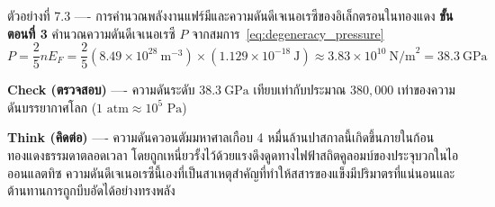 \begin{psctbox}{ตัวอย่างที่ 7.3 ---- การคำนวณพลังงานแฟร์มีและความดันดีเจเนอเรซีของอิเล็กตรอนในทองแดง}
\textbf{ขั้นตอนที่ 3} คำนวณความดันดีเจเนอเรซี $P$
จากสมการ~\eqref{eq:degeneracy_pressure}
\begin{equation*}
P = \frac{2}{5} n E_F = \frac{2}{5} (8.49 \times 10^{28}~\text{m}^{-3}) \times (1.129 \times 10^{-18}~\text{J}) \approx 3.83 \times 10^{10}~\text{N/m}^2 = 38.3~\text{GPa}
\end{equation*}

\textbf{Check (ตรวจสอบ)} ---- ความดันระดับ $38.3~\text{GPa}$ เทียบเท่ากับประมาณ $380,000$ เท่าของความดันบรรยากาศโลก ($1\text{ atm} \approx 10^5\text{ Pa}$)

\textbf{Think (คิดต่อ)} ---- ความดันควอนตัมมหาศาลเกือบ 4 หมื่นล้านปาสกาลนี้เกิดขึ้นภายในก้อนทองแดงธรรมดาตลอดเวลา โดยถูกเหนี่ยวรั้งไว้ด้วยแรงดึงดูดทางไฟฟ้าสถิตคูลอมบ์ของประจุบวกในไอออนแลตทิซ ความดันดีเจเนอเรซีนี้เองที่เป็นสาเหตุสำคัญที่ทำให้สสารของแข็งมีปริมาตรที่แน่นอนและต้านทานการถูกบีบอัดได้อย่างทรงพลัง
\end{psctbox}

